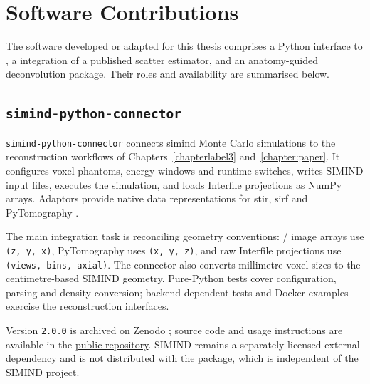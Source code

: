{}
\appendix

\chapter{Software Contributions}
\label{app:software}

The software developed or adapted for this thesis comprises a Python interface to , a  integration of a published scatter estimator, and an anatomy-guided deconvolution package. Their roles and availability are summarised below.

\section[\texttt{simind-python-connector}]{\texttt{simind-python-connector}}
\label{app:simind_python_connector}

\texttt{simind-python-connector} connects \gls{simind} Monte Carlo simulations \cite{ljungberg_monte_1989,ljungbergSIMINDMonteCarlo2012} to the reconstruction workflows of Chapters~\ref{chapterlabel3} and~\ref{chapter:paper}. It configures voxel phantoms, energy windows and runtime switches, writes SIMIND input files, executes the simulation, and loads Interfile projections as NumPy arrays. Adaptors provide native data representations for \gls{stir}, \gls{sirf} and PyTomography \cite{thielemansSTIRSoftwareTomographic2012a,ovtchinnikovSIRFSynergisticImage2020,polson_pytomography_2025}.

The main integration task is reconciling geometry conventions: / image arrays use \texttt{(z, y, x)}, PyTomography uses \texttt{(x, y, z)}, and raw Interfile projections use \texttt{(views, bins, axial)}. The connector also converts millimetre voxel sizes to the centimetre-based SIMIND geometry. Pure-Python tests cover configuration, parsing and density conversion; backend-dependent tests and Docker examples exercise the reconstruction interfaces.

Version \texttt{2.0.0} is archived on Zenodo \cite{porterSimindPythonConnector2026}; source code and usage instructions are available in the \href{https://github.com/samdporter/simind-python-connector}{public repository}. SIMIND remains a separately licensed external dependency and is not distributed with the package, which is independent of the SIMIND project.






